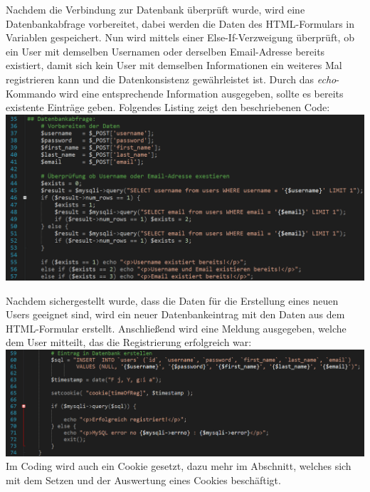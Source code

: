 Nachdem die Verbindung zur Datenbank \"uberpr\"uft wurde, wird eine Datenbankabfrage vorbereitet, dabei werden die Daten des HTML-Formulars in Variablen gespeichert. Nun wird mittels einer Else-If-Verzweigung \"uberpr\"uft, ob ein User mit demselben Usernamen oder derselben Email-Adresse bereits existiert, damit sich kein User mit demselben Informationen ein weiteres Mal registrieren kann und die Datenkonsistenz gew\"ahrleistet ist. Durch das \textit{echo}-Kommando wird eine entsprechende Information ausgegeben, sollte es bereits existente Eintr\"age geben. Folgendes Listing zeigt den beschriebenen Code:
\newline	
\includegraphics[width=1\textwidth]{img/vincent/abb13.png}
\newline

Nachdem sichergestellt wurde, dass die Daten f\"ur die Erstellung eines neuen Users geeignet sind, wird ein neuer Datenbankeintrag mit den Daten aus dem HTML-Formular erstellt. Anschlie{\ss}end wird eine Meldung ausgegeben, welche dem User mitteilt, das die Registrierung erfolgreich war:
\newline	
\includegraphics[width=1\textwidth]{img/vincent/abb14.png}
\newline
Im Coding wird auch ein Cookie gesetzt, dazu mehr im Abschnitt, welches sich mit dem Setzen und der Auswertung eines Cookies besch\"aftigt.	

